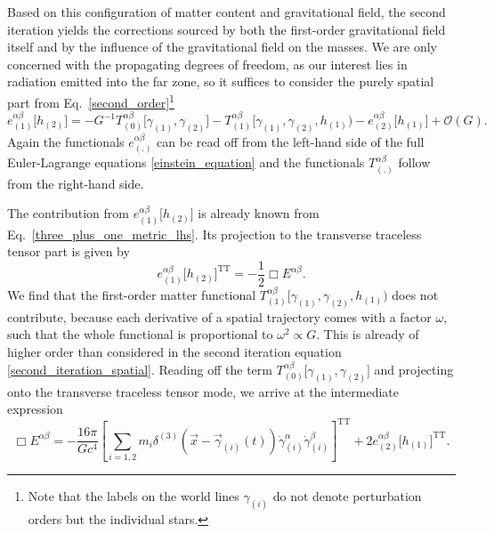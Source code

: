 Based on this configuration of matter content and gravitational field, the second iteration yields the corrections sourced by both the first-order gravitational field itself and by the influence of the gravitational field on the masses. We are only concerned with the propagating degrees of freedom, as our interest lies in radiation emitted into the far zone, so it suffices to consider the purely spatial part from Eq.~\eqref{second_order}\footnote{Note that the labels on the world lines $\gamma_{(i)}$ do not denote perturbation orders but the individual stars.}
\begin{equation}\label{second_iteration_spatial}
  e^{\alpha\beta}_{(1)}\lbrack h_{(2)}\rbrack = -G^{-1} T^{\alpha\beta}_{(0)}\lbrack\gamma_{(1)},\gamma_{(2)}\rbrack - T^{\alpha\beta}_{(1)}\lbrack\gamma_{(1)},\gamma_{(2)},h_{(1)}) - e^{\alpha\beta}_{(2)}\lbrack h_{(1)}\rbrack + \mathcal O(G).
\end{equation}
Again the functionals $e^{\alpha\beta}_{(.)}$ can be read off from the left-hand side of the full Euler-Lagrange equations \eqref{einstein_equation} and the functionals $T^{\alpha\beta}_{(.)}$ follow from the right-hand side.

The contribution from $e^{\alpha\beta}_{(1)}\lbrack h_{(2)}\rbrack$ is already known from Eq.~\eqref{three_plus_one_metric_lhs}. Its projection to the transverse traceless tensor part is given by
\begin{equation}
  e^{\alpha\beta}_{(1)}\lbrack h_{(2)}\rbrack^{\text{TT}} = -\frac{1}{2} \Box E^{\alpha\beta}.
\end{equation}
We find that the first-order matter functional $T^{\alpha\beta}_{(1)}\lbrack\gamma_{(1)},\gamma_{(2)},h_{(1)})$ does not contribute, because each derivative of a spatial trajectory comes with a factor $\omega$, such that the whole functional is proportional to $\omega^2\propto G$. This is already of higher order than considered in the second iteration equation \eqref{second_iteration_spatial}. Reading off the term $T^{\alpha\beta}_{(0)}\lbrack\gamma_{(1)},\gamma_{(2)}\rbrack$ and projecting onto the transverse traceless tensor mode, we arrive at the intermediate expression
\begin{equation}\label{metric_second_order_wave_equation}
  \Box E^{\alpha\beta} = -\frac{16\pi}{Gc^4}\left\lbrack\sum_{i=1,2}m_i\delta^{(3)}(\vec x-\vec\gamma_{(i)}(t))\dot\gamma^\alpha_{(i)}\dot\gamma^\beta_{(i)}\right\rbrack^\text{TT} + 2 e^{\alpha\beta}_{(2)}\lbrack h_{(1)}\rbrack^\text{TT}.
\end{equation}

